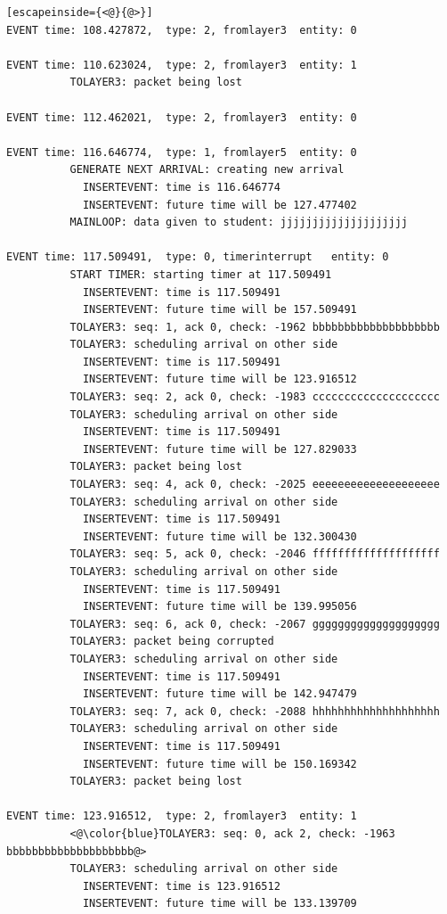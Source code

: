 \documentclass[paper=a4, fontsize=11pt]{scrartcl}
\numberwithin{equation}{section}		%
\numberwithin{figure}{section}			%
\numberwithin{table}{section}				%
\begin{document}
\begin{lstlisting}[escapeinside={<@}{@>}]
EVENT time: 108.427872,  type: 2, fromlayer3  entity: 0

EVENT time: 110.623024,  type: 2, fromlayer3  entity: 1
          TOLAYER3: packet being lost

EVENT time: 112.462021,  type: 2, fromlayer3  entity: 0

EVENT time: 116.646774,  type: 1, fromlayer5  entity: 0
          GENERATE NEXT ARRIVAL: creating new arrival
            INSERTEVENT: time is 116.646774
            INSERTEVENT: future time will be 127.477402
          MAINLOOP: data given to student: jjjjjjjjjjjjjjjjjjjj

EVENT time: 117.509491,  type: 0, timerinterrupt   entity: 0
          START TIMER: starting timer at 117.509491
            INSERTEVENT: time is 117.509491
            INSERTEVENT: future time will be 157.509491
          TOLAYER3: seq: 1, ack 0, check: -1962 bbbbbbbbbbbbbbbbbbbb
          TOLAYER3: scheduling arrival on other side
            INSERTEVENT: time is 117.509491
            INSERTEVENT: future time will be 123.916512
          TOLAYER3: seq: 2, ack 0, check: -1983 cccccccccccccccccccc
          TOLAYER3: scheduling arrival on other side
            INSERTEVENT: time is 117.509491
            INSERTEVENT: future time will be 127.829033
          TOLAYER3: packet being lost
          TOLAYER3: seq: 4, ack 0, check: -2025 eeeeeeeeeeeeeeeeeeee
          TOLAYER3: scheduling arrival on other side
            INSERTEVENT: time is 117.509491
            INSERTEVENT: future time will be 132.300430
          TOLAYER3: seq: 5, ack 0, check: -2046 ffffffffffffffffffff
          TOLAYER3: scheduling arrival on other side
            INSERTEVENT: time is 117.509491
            INSERTEVENT: future time will be 139.995056
          TOLAYER3: seq: 6, ack 0, check: -2067 gggggggggggggggggggg
          TOLAYER3: packet being corrupted
          TOLAYER3: scheduling arrival on other side
            INSERTEVENT: time is 117.509491
            INSERTEVENT: future time will be 142.947479
          TOLAYER3: seq: 7, ack 0, check: -2088 hhhhhhhhhhhhhhhhhhhh
          TOLAYER3: scheduling arrival on other side
            INSERTEVENT: time is 117.509491
            INSERTEVENT: future time will be 150.169342
          TOLAYER3: packet being lost

EVENT time: 123.916512,  type: 2, fromlayer3  entity: 1
          <@\color{blue}TOLAYER3: seq: 0, ack 2, check: -1963 bbbbbbbbbbbbbbbbbbbb@>
          TOLAYER3: scheduling arrival on other side
            INSERTEVENT: time is 123.916512
            INSERTEVENT: future time will be 133.139709


\end{lstlisting}
\end{document}
